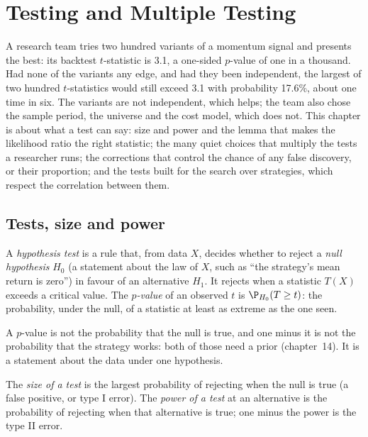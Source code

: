 \chapter{Testing and Multiple Testing}\label{ch:qm:testing-and-multiple-testing}

A research team tries two hundred variants of a momentum signal and presents the best: its backtest $t$-statistic is 3.1,
a one-sided $p$-value of one in a thousand. Had none of the variants any edge, and had they been independent, the largest of
two hundred $t$-statistics would still exceed 3.1 with probability 17.6\%, about one time in six. The variants are not
independent, which helps; the team also chose the sample period, the universe and the cost model, which does not. This
chapter is about what a test can say: size and power and the lemma that makes the likelihood ratio the right statistic; the
many quiet choices that multiply the tests a researcher runs; the corrections that control the chance of any false discovery,
or their proportion; and the tests built for the search over strategies, which respect the correlation between them.

\section{Tests, size and power}

\begin{definition}\label{def:qm:testing-and-multiple-testing:test}
A \emph{hypothesis test} is a rule that, from data $X$, decides whether to reject a \emph{null
hypothesis} $H_0$ (a statement about the law of $X$, such as ``the strategy's mean return is zero'') in favour
of an alternative $H_1$. It rejects when a statistic $T(X)$ exceeds a critical value. The \emph{$p$-value} of an
observed $t$ is $\P_{H_0}(T \ge t)$: the probability, under the null, of a statistic at least as extreme as the one seen.
\end{definition}

A $p$-value is not the probability that the null is true, and one minus it is not the probability that the strategy works:
both of those need a prior (chapter~14). It is a statement about the data under one hypothesis.

\begin{definition}\label{def:qm:testing-and-multiple-testing:size}
The \emph{size of a test} is the largest probability of rejecting when the null is true (a false
positive, or type I error). The \emph{power of a test} at an alternative is the probability of rejecting
when that alternative is true; one minus the power is the type II error.
\end{definition}

